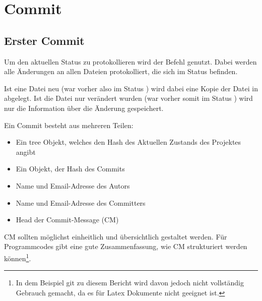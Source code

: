 \section{Commit}
\subsection{Erster Commit}\label{sec:first_commit}
Um den aktuellen Status zu protokollieren wird der Befehl  genutzt. Dabei werden alle Änderungen an allen Dateien protokolliert, die sich im Status  befinden.

Ist eine Datei neu (war vorher also im Status ) wird dabei eine Kopie der Datei in  abgelegt. Ist die Datei nur verändert wurden (war vorher somit im Status ) wird nur die Information über die Änderung gespeichert.

Ein Commit besteht aus mehreren Teilen: 
\begin{itemize}
	\item Ein tree Objekt, welches den Hash des Aktuellen Zustands des Projektes angibt
	\item Ein  Objekt, der Hash des  Commits
	\item Name und Email-Adresse des Autors
	\item Name und Email-Adresse des Committers
	\item Head der Commit-Message (CM)
\end{itemize}
CM sollten möglichst einheitlich und übersichtlich gestaltet werden. Für Programmcodes gibt \cite{conv-Commit} eine gute Zusammenfassung, wie CM strukturiert werden können\footnote{In dem Beispiel git zu diesem Bericht wird davon jedoch nicht vollständig Gebrauch gemacht, da es für Latex Dokumente nicht geeignet ist.}.

